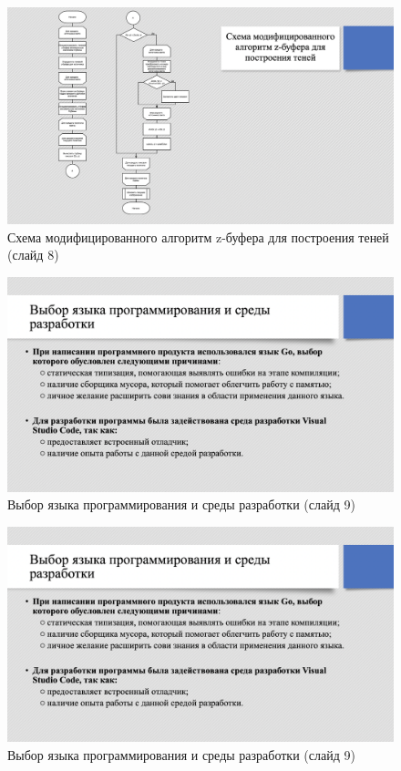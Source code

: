 \begin{figure}[h]
    \centering
    \includegraphics[width=0.5\linewidth]{img/shadow.png}
    \caption{Схема модифицированного алгоритм z-буфера для 
    построения теней (слайд 8)}
    \label{img:shadow}
\end{figure}
\noindent

\begin{figure}[h]
    \centering
    \includegraphics[width=0.5\linewidth]{img/sl.png}
    \caption{Выбор языка программирования и среды разработки (слайд 9)}
    \label{img:sl}
\end{figure}
\noindent

\begin{figure}[h]
    \centering
    \includegraphics[width=0.5\linewidth]{img/sl.png}
    \caption{Выбор языка программирования и среды разработки (слайд 9)}
    \label{img:sl}
\end{figure}
\noindent

